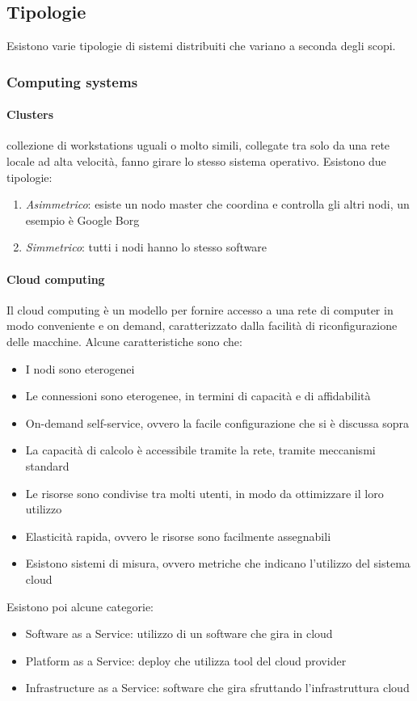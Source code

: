 \subsection{Tipologie}
Esistono varie tipologie di sistemi distribuiti che variano a seconda degli 
scopi.
\subsubsection{Computing systems}
\paragraph{Clusters} collezione di workstations uguali o molto simili, 
collegate tra solo da una rete locale ad alta velocità, fanno girare lo 
stesso sistema operativo.
Esistono due tipologie:
\begin{enumerate}
    \item \emph{Asimmetrico}: esiste un nodo master che coordina 
    e controlla gli altri nodi, un esempio è Google Borg
    \item \emph{Simmetrico}: tutti i nodi hanno lo stesso software
\end{enumerate}

\paragraph{Cloud computing}
Il cloud computing è un modello per fornire accesso a una rete di 
computer in modo conveniente e on demand, caratterizzato dalla 
facilità di riconfigurazione delle macchine.
Alcune caratteristiche sono che:
\begin{itemize}
    \item I nodi sono eterogenei
    \item Le connessioni sono eterogenee, in termini di capacità e di affidabilità
    \item On-demand self-service, ovvero la facile configurazione che si è discussa sopra
    \item La capacità di calcolo è accessibile tramite la rete, tramite meccanismi 
    standard
    \item Le risorse sono condivise tra molti utenti, in modo da ottimizzare il loro utilizzo
    \item Elasticità rapida, ovvero le risorse sono facilmente assegnabili
    \item Esistono sistemi di misura, ovvero metriche che indicano l'utilizzo 
    del sistema cloud
\end{itemize}
Esistono poi alcune categorie: 
\begin{itemize}
    \item Software as a Service: utilizzo di un software che gira in cloud
    \item Platform as a Service: deploy che utilizza tool del cloud provider
    \item Infrastructure as a Service: software che gira sfruttando l'infrastruttura cloud
\end{itemize}

